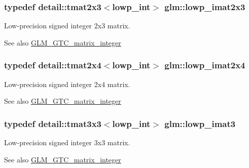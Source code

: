 \subsubsection[{lowp\+\_\+imat2x3}]{\setlength{\rightskip}{0pt plus 5cm}typedef detail\+::tmat2x3$<$lowp\+\_\+int$>$ {\bf glm\+::lowp\+\_\+imat2x3}}\label{group__gtc__matrix__integer_ga09e5448647001fa527ea02951cbca6ec}
Low-\/precision signed integer 2x3 matrix. \begin{DoxySeeAlso}{See also}
\hyperlink{group__gtc__matrix__integer}{G\+L\+M\+\_\+\+G\+T\+C\+\_\+matrix\+\_\+integer} 
\end{DoxySeeAlso}
\hypertarget{group__gtc__matrix__integer_ga413aeb4042293dc84969db1e8f3d0619}{}
\subsubsection[{lowp\+\_\+imat2x4}]{\setlength{\rightskip}{0pt plus 5cm}typedef detail\+::tmat2x4$<$lowp\+\_\+int$>$ {\bf glm\+::lowp\+\_\+imat2x4}}\label{group__gtc__matrix__integer_ga413aeb4042293dc84969db1e8f3d0619}
Low-\/precision signed integer 2x4 matrix. \begin{DoxySeeAlso}{See also}
\hyperlink{group__gtc__matrix__integer}{G\+L\+M\+\_\+\+G\+T\+C\+\_\+matrix\+\_\+integer} 
\end{DoxySeeAlso}
\hypertarget{group__gtc__matrix__integer_ga5ce884d9735040424846bc45671b446a}{}
\subsubsection[{lowp\+\_\+imat3}]{\setlength{\rightskip}{0pt plus 5cm}typedef detail\+::tmat3x3$<$lowp\+\_\+int$>$ {\bf glm\+::lowp\+\_\+imat3}}\label{group__gtc__matrix__integer_ga5ce884d9735040424846bc45671b446a}
Low-\/precision signed integer 3x3 matrix. \begin{DoxySeeAlso}{See also}
\hyperlink{group__gtc__matrix__integer}{G\+L\+M\+\_\+\+G\+T\+C\+\_\+matrix\+\_\+integer} 
\end{DoxySeeAlso}
\hypertarget{group__gtc__matrix__integer_gac67f73a4e34205b8d96af7e85cc7a194}{}
